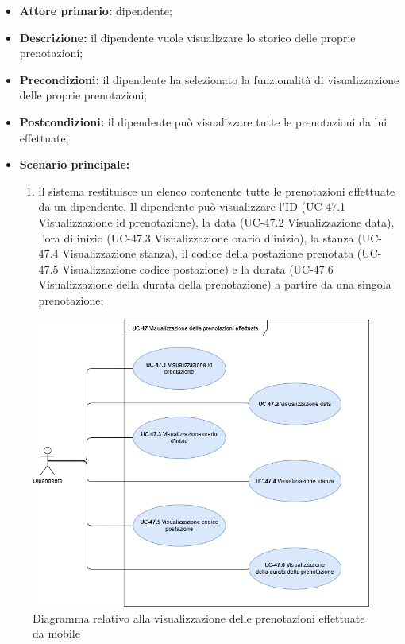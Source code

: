     \begin{itemize}
        \item \textbf{Attore primario:} dipendente;

        \item \textbf{Descrizione:} il dipendente vuole visualizzare lo storico delle proprie prenotazioni;

        \item \textbf{Precondizioni:} il dipendente ha selezionato la funzionalità di visualizzazione delle proprie prenotazioni;

        \item \textbf{Postcondizioni:} il dipendente può visualizzare tutte le prenotazioni da lui effettuate;

        \item \textbf{Scenario principale:}
            \begin{enumerate}
                 \item il sistema restituisce un elenco contenente tutte le prenotazioni effettuate da un dipendente. Il dipendente può visualizzare l'ID (UC-47.1 Visualizzazione id prenotazione), la data (UC-47.2 Visualizzazione data), l'ora di inizio (UC-47.3 Visualizzazione orario d'inizio), la stanza (UC-47.4 Visualizzazione stanza), il codice della postazione prenotata (UC-47.5 Visualizzazione codice postazione) e la durata (UC-47.6 Visualizzazione della durata della prenotazione) a partire da una singola prenotazione;
            \end{enumerate}
    \end{itemize}

    \begin{figure}[H]
		\centering
		  \includegraphics[scale=0.40]{src/CasiDUso/immagini/VisualizzazionePrenotazioni.png}
		\caption{Diagramma relativo alla visualizzazione delle prenotazioni effettuate da mobile}
	\end{figure}


